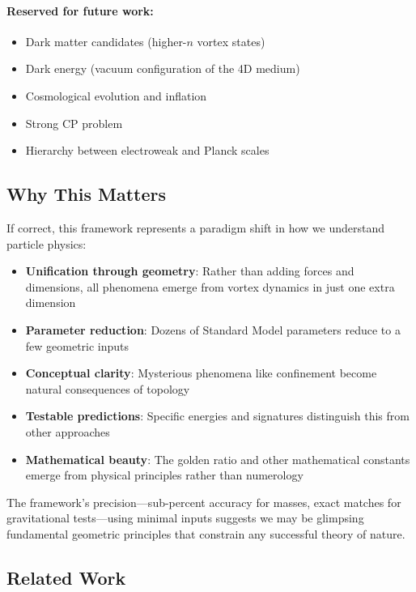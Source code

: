 \paragraph{Reserved for future work:}
\begin{itemize}
\item Dark matter candidates (higher-$n$ vortex states)
\item Dark energy (vacuum configuration of the 4D medium)
\item Cosmological evolution and inflation
\item Strong CP problem
\item Hierarchy between electroweak and Planck scales
\end{itemize}

\subsection{Why This Matters}

If correct, this framework represents a paradigm shift in how we understand particle physics:

\begin{itemize}
\item \textbf{Unification through geometry}: Rather than adding forces and dimensions, all phenomena emerge from vortex dynamics in just one extra dimension
\item \textbf{Parameter reduction}: Dozens of Standard Model parameters reduce to a few geometric inputs
\item \textbf{Conceptual clarity}: Mysterious phenomena like confinement become natural consequences of topology
\item \textbf{Testable predictions}: Specific energies and signatures distinguish this from other approaches
\item \textbf{Mathematical beauty}: The golden ratio and other mathematical constants emerge from physical principles rather than numerology
\end{itemize}

The framework's precision---sub-percent accuracy for masses, exact matches for gravitational tests---using minimal inputs suggests we may be glimpsing fundamental geometric principles that constrain any successful theory of nature.

\subsection{Related Work}

